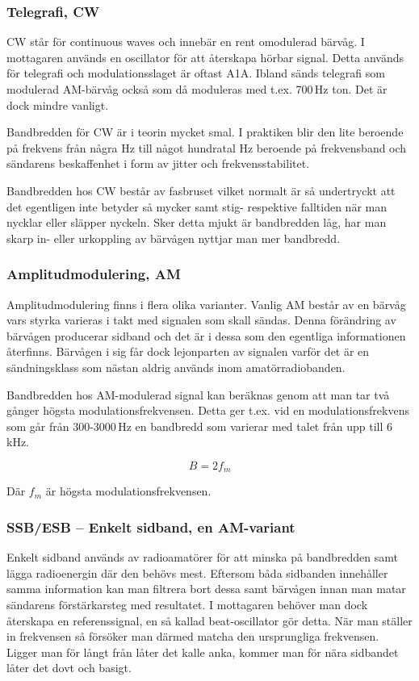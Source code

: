 \subsubsection{Telegrafi, CW}

CW står för continuous waves och innebär en rent omodulerad bärvåg. I mottagaren används en oscillator för att återskapa hörbar signal. Detta används för telegrafi och modulationsslaget är oftast A1A. Ibland sänds telegrafi som modulerad AM-bärvåg också som då moduleras med t.ex. 700\,Hz ton. Det är dock mindre vanligt.

Bandbredden för CW är i teorin mycket smal. I praktiken blir den lite beroende på frekvens från några Hz till något hundratal Hz beroende på frekvensband och sändarens beskaffenhet i form av jitter och frekvensstabilitet.

Bandbredden hos CW består av fasbruset vilket normalt är så undertryckt att det egentligen inte betyder så mycker samt stig- respektive falltiden när man nycklar eller släpper nyckeln. Sker detta mjukt är bandbredden låg, har man skarp in- eller urkoppling av bärvågen nyttjar man mer bandbredd.

\subsubsection{Amplitudmodulering, AM}

Amplitudmodulering finns i flera olika varianter. Vanlig AM består av en bärvåg vars styrka varieras i takt med signalen som skall sändas. Denna förändring av bärvågen producerar sidband och det är i dessa som den egentliga informationen återfinns. Bärvågen i sig får dock lejonparten av signalen varför det är en sändningsklass som nästan aldrig används inom amatörradiobanden.

Bandbredden hos AM-modulerad signal kan beräknas genom att man tar två gånger högsta modulationsfrekvensen. Detta ger t.ex. vid en modulationsfrekvens som går från 300-3000\,Hz en bandbredd som varierar med talet från upp till 6\,kHz.

$$B=2f_m$$

Där $f_m$ är högsta modulationsfrekvensen.

\subsubsection{SSB/ESB -- Enkelt sidband, en AM-variant}

Enkelt sidband används av radioamatörer för att minska på bandbredden samt lägga radioenergin där den behövs mest. Eftersom båda sidbanden innehåller samma information kan man filtrera bort dessa samt bärvågen innan man matar sändarens förstärkarsteg med resultatet. I mottagaren behöver man dock återskapa en referenssignal, en så kallad beat-oscillator gör detta. När man ställer in frekvensen så försöker man därmed matcha den ursprungliga frekvensen. Ligger man för långt från låter det kalle anka, kommer man för nära sidbandet låter det dovt och basigt. 

